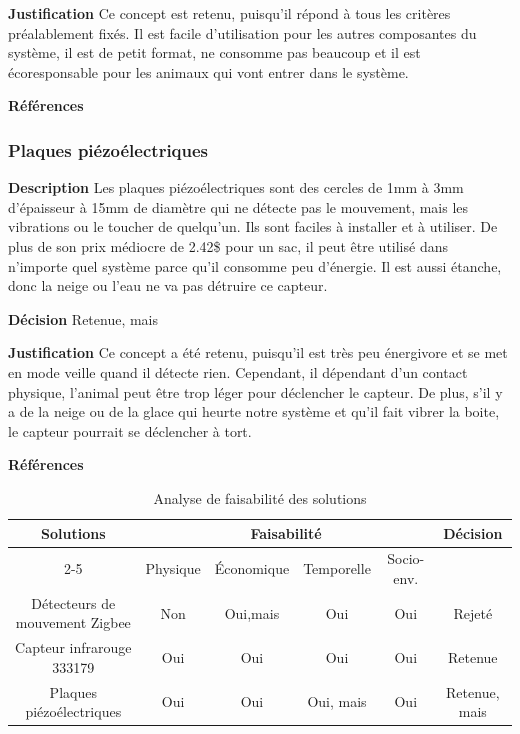 \noindent\textbf{Justification} Ce concept est retenu, puisqu'il répond à tous les critères préalablement fixés. Il est facile d’utilisation pour les autres composantes du système, il est de petit format, ne consomme pas beaucoup et il est écoresponsable pour les animaux qui vont entrer dans le système. 

\noindent\textbf{Références} 
\cite{ArduCam1}
\cite{ArduCam2}

\subsubsection{Plaques piézoélectriques}
\noindent\textbf{Description} Les plaques piézoélectriques sont des cercles de 1mm à 3mm d’épaisseur à 15mm de diamètre qui ne détecte pas le mouvement, mais les vibrations ou le toucher de quelqu’un. Ils sont faciles à installer et à utiliser. De plus de son prix médiocre de 2.42\$ pour un sac, il peut être utilisé dans n’importe quel système parce qu’il consomme peu d’énergie. Il est aussi étanche, donc la neige ou l’eau ne va pas détruire ce capteur. 

\noindent\textbf{Décision} Retenue, mais

\noindent\textbf{Justification} Ce concept a été retenu, puisqu’il est très peu énergivore et se met en mode veille quand il détecte rien. Cependant, il dépendant d’un contact physique, l’animal peut être trop léger pour déclencher le capteur. De plus, s’il y a de la neige ou de la glace qui heurte notre système et qu’il fait vibrer la boite, le capteur pourrait se déclencher à tort.

\noindent\textbf{Références} 
\cite{ArduCam1}
\cite{ArduCam2}

\begin{table}[h]
    \centering
\begin{tabular}{|c|c|c|c|c|c|}
    \hline
    \centering
    \textbf{Solutions} & \multicolumn{4}{c|}{Faisabilité} & \textbf{Décision} \\
    \cline{2-5}
    & Physique & Économique & Temporelle & Socio-env. & \\
    \hline
    Détecteurs de mouvement Zigbee & Non & Oui,mais & Oui & Oui & Rejeté \\
    \hline
    Capteur infrarouge 333179 & Oui & Oui & Oui & Oui & Retenue \\
    \hline
    Plaques piézoélectriques & Oui & Oui & Oui, mais & Oui & Retenue, mais \\
    \hline
\end{tabular}
\caption{Analyse de faisabilité des solutions}
\label{tab:faisabiliteMouvement}
\end{table}
